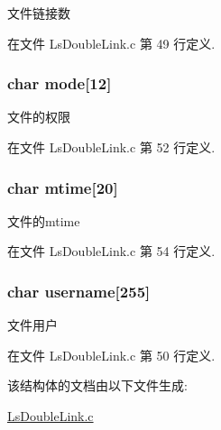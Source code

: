 文件链接数 



在文件 Ls\-Double\-Link.\-c 第 49 行定义.

\hypertarget{struct_file_info_a4a90d35594fe528385e0f34e9412dfbb}{
\subsubsection[{mode}]{\setlength{\rightskip}{0pt plus 5cm}char mode\mbox{[}12\mbox{]}}}\label{struct_file_info_a4a90d35594fe528385e0f34e9412dfbb}


文件的权限 



在文件 Ls\-Double\-Link.\-c 第 52 行定义.

\hypertarget{struct_file_info_a4849c44868992eec100647d14bd7e8d1}{
\subsubsection[{mtime}]{\setlength{\rightskip}{0pt plus 5cm}char mtime\mbox{[}20\mbox{]}}}\label{struct_file_info_a4849c44868992eec100647d14bd7e8d1}


文件的mtime 



在文件 Ls\-Double\-Link.\-c 第 54 行定义.

\hypertarget{struct_file_info_aca24a0305b4170dd5a1b4bfd10dd898a}{
\subsubsection[{username}]{\setlength{\rightskip}{0pt plus 5cm}char username\mbox{[}255\mbox{]}}}\label{struct_file_info_aca24a0305b4170dd5a1b4bfd10dd898a}


文件用户 



在文件 Ls\-Double\-Link.\-c 第 50 行定义.



该结构体的文档由以下文件生成\-:\begin{DoxyCompactItemize}
\item 
\hyperlink{_ls_double_link_8c}{Ls\-Double\-Link.\-c}\end{DoxyCompactItemize}
